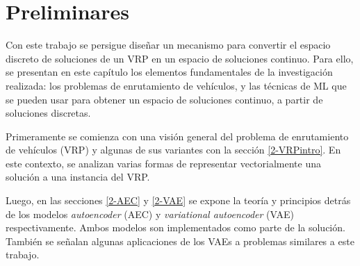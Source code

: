 \chapter{Preliminares}\label{chapter:REV-LL}

Con este trabajo se persigue diseñar un mecanismo para convertir el espacio discreto de soluciones de un VRP en un espacio de soluciones continuo. Para ello, se presentan en este capítulo los elementos fundamentales de la investigación realizada: los problemas de enrutamiento de vehículos, y las técnicas de ML que se pueden usar para obtener un espacio de soluciones continuo, a partir de soluciones discretas. 




Primeramente se comienza con una visión general del problema de enrutamiento de vehículos (VRP) y algunas de sus variantes con la sección \ref{2-VRPintro}. En este contexto, se analizan varias formas de representar vectorialmente una solución a una instancia del VRP.

 Luego, en las secciones \ref{2-AEC} y \ref{2-VAE} se expone la teoría y principios detrás de los modelos \textit{autoencoder} (AEC) y \textit{variational autoencoder} (VAE) respectivamente. Ambos modelos son implementados como parte de la solución. También se señalan  algunas aplicaciones de los VAEs a problemas similares a este trabajo.

